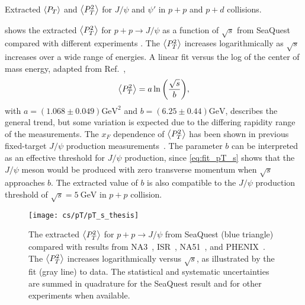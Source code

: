 \documentclass[../main.tex]{subfiles}
\begin{document}
\begin{table}[h!]
	\centering
	\caption{Extracted $\expval{P_T}$ and $\expval{P^2_T}$ for $J/\psi$ and $\psi'$ in $p+p$ and $p+d$ collisions.}
	\label{tab:kaplan_result}
	
\end{table}

 shows the extracted $\expval{P_T^2}$ for $p+p\to J/\psi$ as a function
of $\sqrt{s}$ from SeaQuest compared with different experiments
\cite{badier1983,clark1978,drapier1998,acharya2020}. The $\expval{P_T^2}$
increases logarithmically as $\sqrt{s}$ increases over a wide range of energies.
A linear fit versus the log of the center of mass energy, adapted from Ref.~\cite{acharya2020},
\begin{equation}
	\expval{P_T^2}=a\ln{\left( \frac{\sqrt{s}}{b} \right)},
	\label{eq:fit_pT_s}
\end{equation}
with $a=\left(1.068\pm0.049\right)\unit{\GeV\squared}$ and $b=\left(6.25\pm0.44\right)\unit{\GeV}$,
describes the general trend, but some variation is expected due to the differing
rapidity range of the measurements. The $x_F$ dependence of $\expval{P_T^2}$ has been shown in
previous fixed-target $J/\psi$ production measurements~\cite{biino1987}.
The parameter $b$ can be interpreted as an effective threshold for $J/\psi$ production, 
since \cref{eq:fit_pT_s} shows that the $J/\psi$ meson would be produced with zero transverse
momentum when $\sqrt{s}$ approaches $b$.
The extracted value of $b$ is also compatible to the $J/\psi$ production threshold of $\sqrt{s}=\SI{5}{\GeV}$
in $p+p$ collision.
\begin{figure}
	\centering
	\texttt{[image: cs/pT/pT\_s\_thesis]}
	\caption{The extracted $\expval{P_T^2}$ for $p+p\rightarrow J/\psi$ from SeaQuest (blue triangle) compared
		with results from NA3~\cite{badier1983}, ISR~\cite{clark1978}, NA51~\cite{drapier1998},
		and PHENIX~\cite{acharya2020}. The $\expval{P_T^2}$ increases logarithmically versus $\sqrt{s}$,
    	as illustrated by the fit (gray line) to data.
		The statistical and systematic uncertainties are summed in quadrature for
		the SeaQuest result and for other experiments when available.   }
	\label{fig:pT_s}
\end{figure}

\FloatBarrier

\ifSubfilesClassLoaded{ \printbibliography[heading=bibintoc,title={References}]}{}
\end{document}
